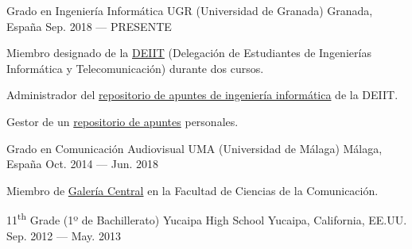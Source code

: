 
\begin{cventries}

\cventry%
	{Grado en Ingeniería Informática} %
	{UGR (Universidad de Granada)} %
	{Granada, España} %
	{Sep. 2018 --- PRESENTE} %
	{%
		\begin{cvitems} %
			\item Miembro designado de la \href{https://deiit.ugr.es/}{DEIIT} (Delegación de Estudiantes de Ingenierías Informática y Telecomunicación) durante dos cursos.
			\item Administrador del \href{https://github.com/DEIIT/Ingenieria-Informatica}{repositorio de apuntes de ingeniería informática} de la DEIIT\@.
			\item Gestor de un \href{https://github.com/Groctel/ugr-informatica}{repositorio de apuntes} personales.
		\end{cvitems}
	}

\cventry%
	{Grado en Comunicación Audiovisual}
	{UMA (Universidad de Málaga)}
	{Málaga, España}
	{Oct. 2014 --- Jun. 2018}
	{%
		\begin{cvitems}
			\item Miembro de \href{https://twitter.com/galeriacentral}{Galería Central} en la Facultad de Ciencias de la Comunicación.
		\end{cvitems}
	}

\cventry%
	{11\textsuperscript{th} Grade (1º de Bachillerato)}
	{Yucaipa High School}
	{Yucaipa, California, EE.UU.}
	{Sep. 2012 --- May. 2013}
	{}

\end{cventries}
